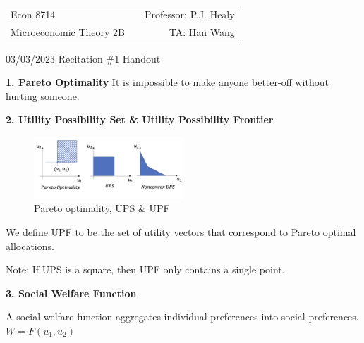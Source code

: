 \documentclass[11pt,leqno]{article}
\begin{document}
\vspace*{-20mm}

\begin{tabular*}{\textwidth}{@{\extracolsep{\fill}}lcr}
Econ 8714     & \hfill    &         Professor: P.J. Healy          \\
Microeconomic Theory 2B  &           &   TA: Han Wang    
\end{tabular*}

\bigskip
\begin{center}
{\Large 03/03/2023 Recitation \#1 Handout}
\end{center}

\bigskip

\textbf{1. Pareto Optimality}
It is impossible to make anyone better-off without hurting someone. 

\textbf{2. Utility Possibility Set \& Utility Possibility Frontier}

 \begin{figure}[h]
    \centering
    \includegraphics[width=0.5\textwidth]{figure 6.png}
    \caption{Pareto optimality, UPS \& UPF}
    \label{fig:3}
\end{figure}

We define UPF to be the set of utility vectors that correspond to Pareto optimal allocations.

Note: If UPS is a square, then UPF only contains a single point.

\textbf{3. Social Welfare Function}

A social welfare function aggregates individual preferences into social preferences. $W=F(u_{1},u_{2})$
\end{document}

